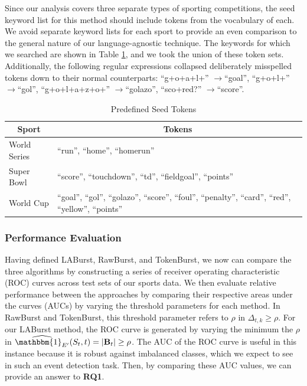 \documentclass[letterpaper]{article}
\begin{document}
Since our analysis covers three separate types of sporting competitions, the seed keyword list for this method should include tokens from the vocabulary of each. 
We avoid separate keyword lists for each sport to provide an even comparison to the general nature of our language-agnostic technique.
The keywords for which we searched are shown in Table \ref{tab:targetTokens}, and we took the union of these token sets.
Additionally, the following regular expressions collapsed deliberately misspelled tokens down to their normal counterparts: ``g+o+a+l+'' $\rightarrow$``goal'', ``g+o+l+'' $\rightarrow$``gol'', ``g+o+l+a+z+o+'' $\rightarrow$``golazo'', ``sco+red?'' $\rightarrow$``score''.
%
\begin{table}[htdp]
\footnotesize
\caption{Predefined Seed Tokens}
\begin{center}
\begin{tabular}{|p{0.75in}|p{2.0in}|}
\hline
\multicolumn{1}{|c|}{\textbf{Sport}} & \multicolumn{1}{|c|}{\textbf{Tokens}} \\ \hline
World Series & ``run'', ``home'', ``homerun'' \\ \hline
Super Bowl & ``score'', ``touchdown'', ``td'', ``fieldgoal'', ``points'' \\ \hline
World Cup & ``goal'', ``gol'', ``golazo'', ``score'', ``foul'', ``penalty'', ``card'', ``red'', ``yellow'', ``points'' \\ \hline
\end{tabular}
\end{center}
\label{tab:targetTokens}
\end{table}

\subsubsection{Performance Evaluation}

Having defined LABurst, RawBurst, and TokenBurst, we now can compare the three algorithms by constructing a series of receiver operating characteristic (ROC) curves across test sets of our sports data.
We then evaluate relative performance between the approaches by comparing their respective areas under the curves (AUCs) by varying the threshold parameters for each method.
In RawBurst and TokenBurst, this threshold parameter refers to $\rho$ in $\Delta_{t, k} \ge \rho$.
For our LABurst method, the ROC curve is generated by varying the minimum the $\rho$ in $\widehat{\mathbbm{1}_{E'}}(S_t, t) = |\mathbf{B}_t| \ge \rho$.
The AUC of the ROC curve is useful in this instance because it is robust against imbalanced classes, which we expect to see in such an event detection task.
Then, by comparing these AUC values, we can provide an answer to \textbf{RQ1}.
\end{document}
